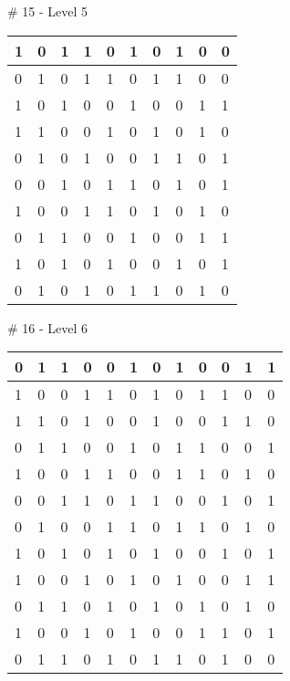 \smallskip

\# 15 - Level 5 \newline
\begin{tabular}{|m{\collen}|m{\collen}|m{\collen}|m{\collen}|m{\collen}|m{\collen}|m{\collen}|m{\collen}|m{\collen}|m{\collen}|}
\hline
  1 & 0 & 1 & 1 & 0 & 1 & 0 & 1 & 0 & 0 \\
\hline
  0 & 1 & 0 & 1 & 1 & 0 & 1 & 1 & 0 & 0 \\
\hline
  1 & 0 & 1 & 0 & 0 & 1 & 0 & 0 & 1 & 1 \\
\hline
  1 & 1 & 0 & 0 & 1 & 0 & 1 & 0 & 1 & 0 \\
\hline
  0 & 1 & 0 & 1 & 0 & 0 & 1 & 1 & 0 & 1 \\
\hline
  0 & 0 & 1 & 0 & 1 & 1 & 0 & 1 & 0 & 1 \\
\hline
  1 & 0 & 0 & 1 & 1 & 0 & 1 & 0 & 1 & 0 \\
\hline
  0 & 1 & 1 & 0 & 0 & 1 & 0 & 0 & 1 & 1 \\
\hline
  1 & 0 & 1 & 0 & 1 & 0 & 0 & 1 & 0 & 1 \\
\hline
  0 & 1 & 0 & 1 & 0 & 1 & 1 & 0 & 1 & 0 \\
\hline
\end{tabular}


\smallskip

\# 16 - Level 6 \newline
\begin{tabular}{|m{\collen}|m{\collen}|m{\collen}|m{\collen}|m{\collen}|m{\collen}|m{\collen}|m{\collen}|m{\collen}|m{\collen}|m{\collen}|m{\collen}|}
\hline
  0 & 1 & 1 & 0 & 0 & 1 & 0 & 1 & 0 & 0 & 1 & 1 \\
\hline
  1 & 0 & 0 & 1 & 1 & 0 & 1 & 0 & 1 & 1 & 0 & 0 \\
\hline
  1 & 1 & 0 & 1 & 0 & 0 & 1 & 0 & 0 & 1 & 1 & 0 \\
\hline
  0 & 1 & 1 & 0 & 0 & 1 & 0 & 1 & 1 & 0 & 0 & 1 \\
\hline
  1 & 0 & 0 & 1 & 1 & 0 & 0 & 1 & 1 & 0 & 1 & 0 \\
\hline
  0 & 0 & 1 & 1 & 0 & 1 & 1 & 0 & 0 & 1 & 0 & 1 \\
\hline
  0 & 1 & 0 & 0 & 1 & 1 & 0 & 1 & 1 & 0 & 1 & 0 \\
\hline
  1 & 0 & 1 & 0 & 1 & 0 & 1 & 0 & 0 & 1 & 0 & 1 \\
\hline
  1 & 0 & 0 & 1 & 0 & 1 & 0 & 1 & 0 & 0 & 1 & 1 \\
\hline
  0 & 1 & 1 & 0 & 1 & 0 & 1 & 0 & 1 & 0 & 1 & 0 \\
\hline
  1 & 0 & 0 & 1 & 0 & 1 & 0 & 0 & 1 & 1 & 0 & 1 \\
\hline
  0 & 1 & 1 & 0 & 1 & 0 & 1 & 1 & 0 & 1 & 0 & 0 \\
\hline
\end{tabular}



